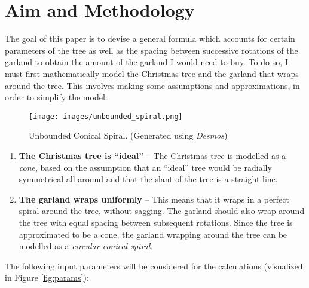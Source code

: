 \section{Aim and Methodology}
The goal of this paper is to devise a general formula which accounts for certain parameters of the tree as well as the spacing between successive rotations of the garland to obtain the amount of the garland I would need to buy. To do so, I must first mathematically model the Christmas tree and the garland that wraps around the tree. This involves making some assumptions and approximations, in order to simplify the model:
\begin{wrapfigure}{r}{0.35\textwidth}
    \texttt{[image: images/unbounded\_spiral.png]}
    \caption{Unbounded Conical Spiral. (Generated using \emph{Desmos})}
    \vspace*{-20pt}
\end{wrapfigure}
\begin{enumerate}[leftmargin=!, itemindent=-5ex]
    \item \textbf{The Christmas tree is “ideal”} -- The Christmas tree is modelled as a \emph{cone}, based on the assumption that an “ideal” tree would be radially symmetrical all around and that the slant of the tree is a straight line.
    \item \textbf{The garland wraps uniformly} -- This means that it wraps in a perfect spiral around the tree, without sagging. The garland should also wrap around the tree with equal spacing between subsequent rotations. Since the tree is approximated to be a cone, the garland wrapping around the tree can be modelled as a \emph{circular conical spiral}.
\end{enumerate}
The following input parameters will be considered for the calculations (visualized in Figure \ref{fig:params}):

